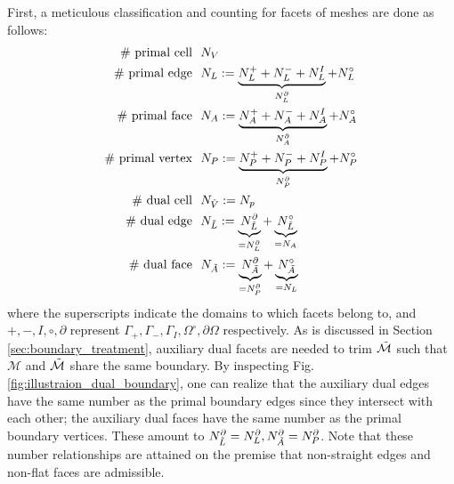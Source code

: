 \documentclass{article}
\begin{document}
First, a meticulous classification and counting for facets of meshes are done as follows:
\begin{align*}
    \#\  \text{primal cell}\ \  &N_V \\
    \#\  \text{primal edge}\ \  &N_L := \underbrace{N^+_L + N^-_L + N^I_L}_{N^\partial_L} + N^\circ_L  \\
    \#\  \text{primal face}\ \  &N_A := \underbrace{N_A^+ + N_A^- + N^I_A}_{N^\partial_A} + N^\circ_A  \\
    \#\  \text{primal vertex}\ \  &N_P := \underbrace{N_P^+ + N_P^- + N^I_P}_{N^\partial_P} + N^\circ_P \\
    \#\  \text{dual cell}\ \  &N_{\Tilde{V}} := N_p \\
    \#\  \text{dual edge}\ \  &N_{\Tilde{L}} := \underbrace{N^\partial_{\Tilde{L}}}_{=N^\partial_L} + \underbrace{N^\circ_{\Tilde{L}}}_{=N_A} \\
    \#\  \text{dual face}\ \  &N_{\Tilde{A}} := \underbrace{N^\partial_{\Tilde{A}}}_{=N^\partial_P} + \underbrace{N^\circ_{\Tilde{A}}}_{=N_L}
\end{align*}
where the superscripts indicate the domains to which facets belong to, and $+,-,I,\circ,\partial$ represent $\Gamma_+, \Gamma_-, \Gamma_I, \Omega^\circ, \partial \Omega$ respectively. As is discussed in Section \ref{sec:boundary_treatment}, auxiliary dual facets are needed to trim $\Tilde{\mathcal{M}}$ such that $\mathcal{M}$ and $\Tilde{\mathcal{M}}$ share the same boundary. By inspecting Fig. \ref{fig:illustraion_dual_boundary}, one can realize that the auxiliary dual edges have the same number as the primal boundary edges since they intersect with each other; the auxiliary dual faces have the same number as the primal boundary vertices. These amount to $N^\partial_{\Tilde{L}} = N^\partial_L, N^\partial_{\Tilde{A}} = N^\partial_P$. Note that these number relationships are attained on the premise that non-straight edges and non-flat faces are admissible.
\end{document}
